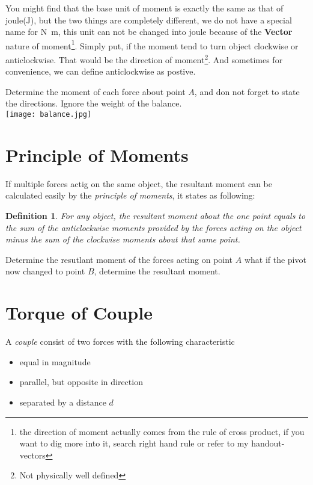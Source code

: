 \documentclass[a4paper]{tufte-handout}
\newtheorem{definition}[theorem]{Definition}%
\newenvironment{TaskBox} %
{\begin{tcolorbox}[breakable,colback=b1!30,colframe=b1,title=Task]} {\end{tcolorbox}}
\begin{document}
You might find that the base unit of moment is exactly the same as that of joule(\si{\J}), but the two things are completely different, we do not have a special name for \si{\N\m}, this unit can not be changed into joule because of the \textbf{Vector} nature of moment\footnote{the direction of moment actually comes from the rule of cross product, if you want to dig more into it, search right hand rule or refer to my handout-vectors}. Simply put, if the moment tend to turn object clockwise or anticlockwise. That would be the direction of moment\footnote{Not physically well defined}. And sometimes for convenience, we can define anticlockwise as postive.
\begin{TaskBox}
Determine the moment of each force about point $A$, and don not forget to state the directions. Ignore the weight of the balance.\\
\texttt{[image: balance.jpg]}
\vspace{1in} 
\end{TaskBox}

\section{Principle of Moments}
If multiple forces actig on the same object, the resultant moment can be calculated easily by the \emph{principle of moments}, it states as following:
\begin{definition}
For any object, the resultant moment about the one point equals to the sum of the anticlockwise moments provided by the forces acting on the object minus the sum of the clockwise moments about that same point.
\end{definition}
\begin{TaskBox}
Determine the resutlant moment of the forces acting on point $A$
\tcblower
what if the pivot now changed to point $B$, determine the resultant moment.
\end{TaskBox}

\section{Torque of Couple}
A \emph{couple} consist of two forces with the following characteristic
\begin{itemize}
  \item equal in magnitude
  \item parallel, but opposite in direction
  \item separated by a distance $d$
\end{itemize}
\end{document}
